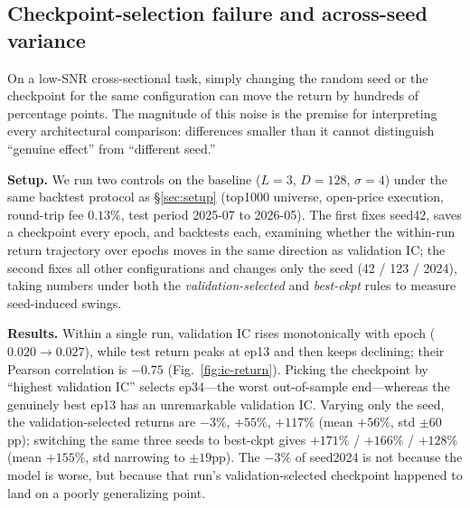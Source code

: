 \documentclass[a4paper,11pt]{article}
\begin{document}
\subsection{Checkpoint-selection failure and across-seed variance}\label{sec:select}
On a low-SNR cross-sectional task, simply changing the random seed or the
checkpoint for the same configuration can move the return by hundreds of
percentage points. The magnitude of this noise is the premise for interpreting
every architectural comparison: differences smaller than it cannot distinguish
``genuine effect'' from ``different seed.''

\textbf{Setup.} We run two controls on the baseline ($L{=}3$, $D{=}128$,
$\sigma{=}4$) under the same backtest protocol as \S\ref{sec:setup} (top1000
universe, open-price execution, round-trip fee $0.13\%$, test period 2025-07 to
2026-05). The first fixes seed42, saves a checkpoint every epoch, and backtests
each, examining whether the within-run return trajectory over epochs moves in
the same direction as validation IC; the second fixes all other configurations
and changes only the seed (42 / 123 / 2024), taking numbers under both the
\emph{validation-selected} and \emph{best-ckpt} rules to measure seed-induced
swings.

\textbf{Results.} Within a single run, validation IC rises monotonically
with epoch ($0.020\to0.027$), while test return peaks at ep13 and then keeps
declining; their Pearson correlation is $-0.75$ (Fig.~\ref{fig:ic-return}).
Picking the checkpoint by ``highest validation IC'' selects ep34---the worst
out-of-sample end---whereas the genuinely best ep13 has an unremarkable
validation IC. Varying only the seed, the validation-selected returns are
$-3\%$, $+55\%$, $+117\%$ (mean $+56\%$, std $\pm60$pp); switching the same
three seeds to best-ckpt gives $+171\%$ / $+166\%$ / $+128\%$ (mean $+155\%$,
std narrowing to $\pm19$pp). The $-3\%$ of seed2024 is not because the model is
worse, but because that run's validation-selected checkpoint happened to land
on a poorly generalizing point.
\end{document}
